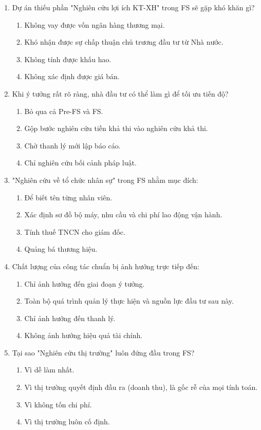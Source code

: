 \begin{enumerate}[label=\textbf{Câu \arabic*:}, leftmargin=*, resume]
\item Dự án thiếu phần "Nghiên cứu lợi ích KT-XH" trong FS sẽ gặp khó khăn gì?
\begin{enumerate}[label=\Alph*.]
    \item Không vay được vốn ngân hàng thương mại.
    \item Khó nhận được sự chấp thuận chủ trương đầu tư từ Nhà nước.
    \item Không tính được khấu hao.
    \item Không xác định được giá bán.
\end{enumerate}

\item Khi ý tưởng rất rõ ràng, nhà đầu tư có thể làm gì để tối ưu tiến độ?
\begin{enumerate}[label=\Alph*.]
    \item Bỏ qua cả Pre-FS và FS.
    \item Gộp bước nghiên cứu tiền khả thi vào nghiên cứu khả thi.
    \item Chờ thanh lý mới lập báo cáo.
    \item Chỉ nghiên cứu bối cảnh pháp luật.
\end{enumerate}

\item "Nghiên cứu về tổ chức nhân sự" trong FS nhằm mục đích:
\begin{enumerate}[label=\Alph*.]
    \item Để biết tên từng nhân viên.
    \item Xác định sơ đồ bộ máy, nhu cầu và chi phí lao động vận hành.
    \item Tính thuế TNCN cho giám đốc.
    \item Quảng bá thương hiệu.
\end{enumerate}

\item Chất lượng của công tác chuẩn bị ảnh hưởng trực tiếp đến:
\begin{enumerate}[label=\Alph*.]
    \item Chỉ ảnh hưởng đến giai đoạn ý tưởng.
    \item Toàn bộ quá trình quản lý thực hiện và nguồn lực đầu tư sau này.
    \item Chỉ ảnh hưởng đến thanh lý.
    \item Không ảnh hưởng hiệu quả tài chính.
\end{enumerate}

\item Tại sao "Nghiên cứu thị trường" luôn đứng đầu trong FS?
\begin{enumerate}[label=\Alph*.]
    \item Vì dễ làm nhất.
    \item Vì thị trường quyết định đầu ra (doanh thu), là gốc rễ của mọi tính toán.
    \item Vì không tốn chi phí.
    \item Vì thị trường luôn cố định.
\end{enumerate}


\end{enumerate}
